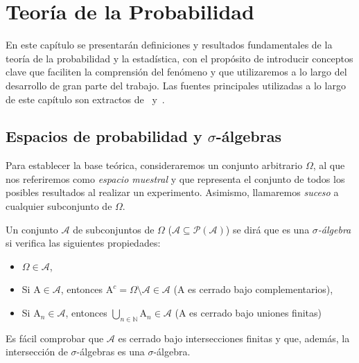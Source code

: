 
\chapter{Teoría de la Probabilidad}\label{ch:capitulo-teoria-de-la-probabilidad}

En este capítulo se presentarán definiciones y resultados fundamentales de la teoría de la probabilidad y la estadística, con el propósito de introducir conceptos clave que faciliten la comprensión del fenómeno y que utilizaremos a lo largo del desarrollo de gran parte del trabajo. Las fuentes principales utilizadas a lo largo de este capítulo son extractos de~\cite{Dembo2014} y~\cite{Knill2009}.\newline

\section{Espacios de probabilidad y $\sigma$-álgebras}

Para establecer la base teórica, consideraremos un conjunto arbitrario $\Omega$, al que nos referiremos como \emph{espacio muestral} y que representa el conjunto de todos los posibles resultados al realizar un experimento. Asimismo, llamaremos \emph{suceso} a cualquier subconjunto de $\Omega$.\newline

\begin{definicion}\label{def:sigma-algebra}
    Un conjunto $\mathcal{A}$ de subconjuntos de $\Omega$ ($\mathcal{A} \subseteq \mathcal{P}(\mathcal{A})$) se dirá que es una \emph{$\sigma$-álgebra} si verifica las siguientes propiedades:

    \begin{itemize}
        \item $\Omega \in \mathcal{A}$,
        \item Si $\mathrm{A} \in \mathcal{A}$, entonces $\mathrm{A}^c = \Omega \setminus \mathcal{A} \in \mathcal{A}$ ($\mathrm{A}$ es cerrado bajo complementarios),
        \item Si $\mathrm{A}_{n} \in \mathcal{A}$, entonces $\bigcup_{n \in \mathbb{N}} \mathrm{A}_{n} \in \mathcal{A}$ (A es cerrado bajo uniones finitas)
    \end{itemize}
\end{definicion}

Es fácil comprobar que $\mathcal{A}$ es cerrado bajo intersecciones finitas y que, además, la intersección de $\sigma$-álgebras es una $\sigma$-álgebra.\newline

